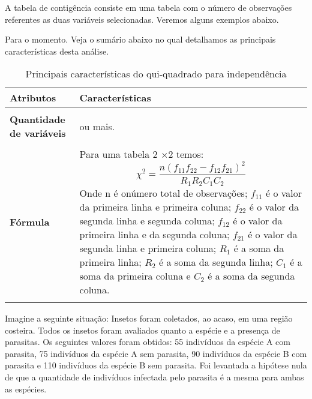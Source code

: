 \documentclass[14pt,titlepage, oneside, openany, a4paper]{book}
\begin{document}
A tabela de contigência consiste em uma tabela com o número de observações referentes as duas variáveis selecionadas. Veremos alguns exemplos abaixo.

Para o momento. Veja o sumário abaixo no qual detalhamos as principais características desta análise.

\begin{table}

\caption{\label{tab:tab2qui}Principais características do qui-quadrado para independência}
\centering
\begin{tabular}[c]{>{\raggedright\arraybackslash}p{10em}>{\raggedright\arraybackslash}p{30em}}
\toprule
Atributos & Características\\
\midrule
\textbf{\cellcolor{gray!6}{Tipo de variável}} & \cellcolor{gray!6}{Categórica.}\\
\textbf{Quantidade de variáveis} & 2 ou mais.\\
\textbf{\cellcolor{gray!6}{Hipótese nula}} & \cellcolor{gray!6}{As proporções relativas de uma variável são independentes de uma segunda variável.}\\
\textbf{Fórmula} & Para uma tabela 2 $\times$2 temos: $$\chi^{2} = \frac{n(f_{11}f_{22}-f_{12}f_{21})^2}{R_{1}R_{2}C_{1}C_{2}}$$ Onde n é onúmero total de observações; $f_{11}$ é o valor da primeira linha e primeira coluna; $f_{22}$ é o valor da segunda linha e segunda coluna; $f_{12}$ é o valor da primeira linha e da segunda coluna; $f_{21}$ é o valor da segunda linha e primeira coluna; $R_{1}$ é a soma da primeira linha; $R_{2}$ é a soma da segunda linha; $C_{1}$ é a soma da primeira coluna e $C_{2}$ é a soma da segunda coluna.\\
\textbf{\cellcolor{gray!6}{Observação}} & \cellcolor{gray!6}{Como característica intrinseca a este teste é necessário a construção da tabela de contigência.}\\
\bottomrule
\end{tabular}
\end{table}

Imagine a seguinte situação: Insetos foram coletados, ao acaso, em uma região costeira. Todos os insetos foram avaliados quanto a espécie e a presença de parasitas. Os seguintes valores foram obtidos: 55 indivíduos da espécie A com parasita, 75 indivíduos da espécie A sem parasita, 90 indivíduos da espécie B com parasita e 110 indivíduos da espécie B sem parasita. Foi levantada a hipótese nula de que a quantidade de indivíduos infectada pelo parasita é a mesma para ambas as espécies.
\end{document}
